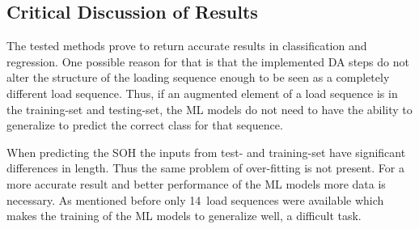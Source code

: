 \subsection{Critical Discussion of Results}

The tested methods prove to return accurate results in classification and regression. One possible reason for that is that the implemented DA steps do not alter the structure of the loading sequence enough to be seen as a completely different load sequence. Thus, if an augmented element of a load sequence is in the training-set and testing-set, the ML models do not need to have the ability to generalize to predict the correct class for that sequence. 

When predicting the SOH the inputs from test- and training-set have significant differences in length. Thus the same problem of over-fitting is not present. For a more accurate result and better performance of the ML models more data is necessary. As mentioned before only 14~load sequences were available which makes the training of the ML models to generalize well, a difficult task.   

\afterpage{\null\newpage}